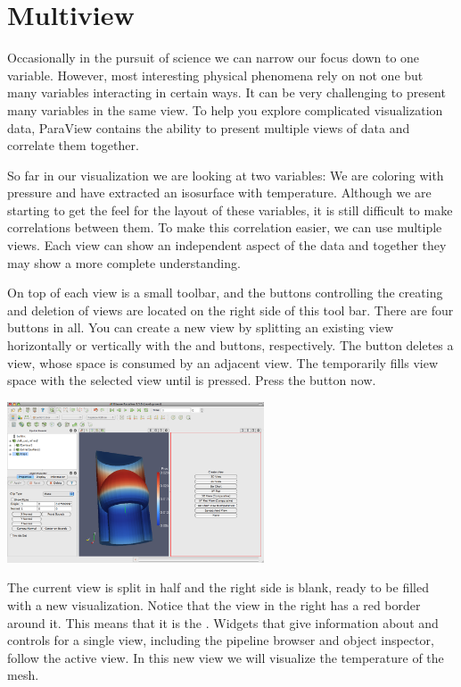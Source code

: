 \section{Multiview}
\label{sec:Multiview}

Occasionally in the pursuit of science we can narrow our focus down to one
variable.  However, most interesting physical phenomena rely on not one but
many variables interacting in certain ways.  It can be very challenging to
present many variables in the same view.  To help you explore complicated
visualization data, ParaView contains the ability to present multiple views
of data and correlate them together.

So far in our visualization we are looking at two variables: We are
coloring with pressure and have extracted an isosurface with temperature.
Although we are starting to get the feel for the layout of these variables,
it is still difficult to make correlations between them.  To make this
correlation easier, we can use multiple views.  Each view can show an
independent aspect of the data and together they may show a more complete
understanding.

On top of each view is a small toolbar, and the buttons controlling the
creating and deletion of views are located on the right side of this tool
bar.  There are four buttons in all.  You can create a new view by
splitting an existing view horizontally or vertically with the \splitViewH
and \splitViewV buttons, respectively.  The \deleteView button deletes a
view, whose space is consumed by an adjacent view.  The \maximizeView
temporarily fills view space with the selected view until \restoreView is
pressed.  Press the \splitViewH button now.

\begin{inlinefig}
  \includegraphics[width=3in]{images/SplitView1}
\end{inlinefig}

The current view is split in half and the right side is blank, ready to be
filled with a new visualization.  Notice that the view in the right has a
red border around it.  This means that it is the .
Widgets that give information about and controls for a single view,
including the pipeline browser and object inspector, follow the active
view.  In this new view we will visualize the temperature of the mesh.

